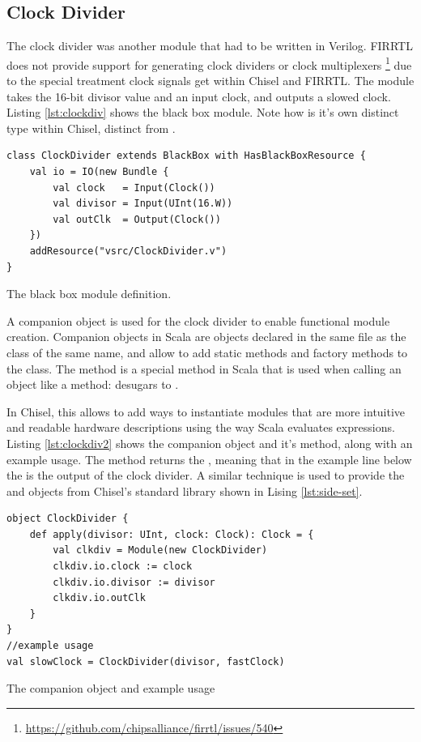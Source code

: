 \subsection{Clock Divider}

The clock divider was another module that had to be written in Verilog. FIRRTL does not provide support for generating clock dividers or clock multiplexers \footnote{\url{https://github.com/chipsalliance/firrtl/issues/540}} due to the special treatment clock signals get within Chisel and FIRRTL. The module takes the 16-bit divisor value and an input clock, and outputs a slowed clock. Listing \ref{lst:clockdiv} shows the black box module. Note how  is it's own distinct type within Chisel, distinct from .

\begin{listing}[h!]
    \centering
    \vspace{0.5cm}
    \begin{verbatim}
class ClockDivider extends BlackBox with HasBlackBoxResource {
    val io = IO(new Bundle {
        val clock   = Input(Clock())
        val divisor = Input(UInt(16.W))
        val outClk  = Output(Clock())
    })
    addResource("vsrc/ClockDivider.v")
}
    \end{verbatim}
    \caption{The  black box module definition.}
    \label{lst:clockdiv}
\end{listing}

A companion object is used for the clock divider to enable functional module creation. Companion objects in Scala are objects declared in the same file as the class of the same name, and allow to add static methods and factory methods to the class. The  method is a special method in Scala that is used when calling an object like a method:  desugars to  \cite{scala_book}.

In Chisel, this allows to add ways to instantiate modules that are more intuitive and readable hardware descriptions using the way Scala evaluates expressions. Listing \ref{lst:clockdiv2} shows the  companion object and it's  method, along with an example usage. The method returns the , meaning that in the example line below the  is the output of the clock divider. A similar technique is used to provide the  and  objects from Chisel's standard library shown in Lising \ref{lst:side-set}.

\begin{listing}[h!]
    \centering
    \vspace{0.5cm}
    \begin{verbatim}
object ClockDivider {
    def apply(divisor: UInt, clock: Clock): Clock = {
        val clkdiv = Module(new ClockDivider)
        clkdiv.io.clock := clock
        clkdiv.io.divisor := divisor
        clkdiv.io.outClk
    }
}
//example usage
val slowClock = ClockDivider(divisor, fastClock)
    \end{verbatim}
    \caption{The  companion object and example usage}
    \label{lst:clockdiv2}
\end{listing}

